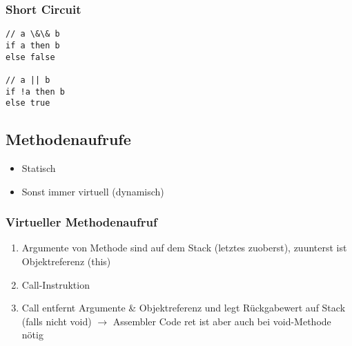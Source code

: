 \subsubsection{Short Circuit}
\begin{lstlisting}
// a \&\& b
if a then b
else false

// a || b
if !a then b
else true
\end{lstlisting}

\subsection{Methodenaufrufe}
\begin{itemize}[topsep=0pt]
    \itemsep -0.2em
    \item Statisch
    \item Sonst immer virtuell (dynamisch)
\end{itemize}

\subsubsection{Virtueller Methodenaufruf}
\begin{enumerate}[topsep=0pt]
    \itemsep -0.2em
    \item Argumente von Methode sind auf dem Stack (letztes zuoberst), zuunterst ist Objektreferenz (this)
    \item Call-Instruktion
    \item Call entfernt Argumente \& Objektreferenz und legt Rückgabewert auf Stack (falls nicht void) $\rightarrow$ Assembler Code ret ist aber auch bei void-Methode nötig
\end{enumerate}